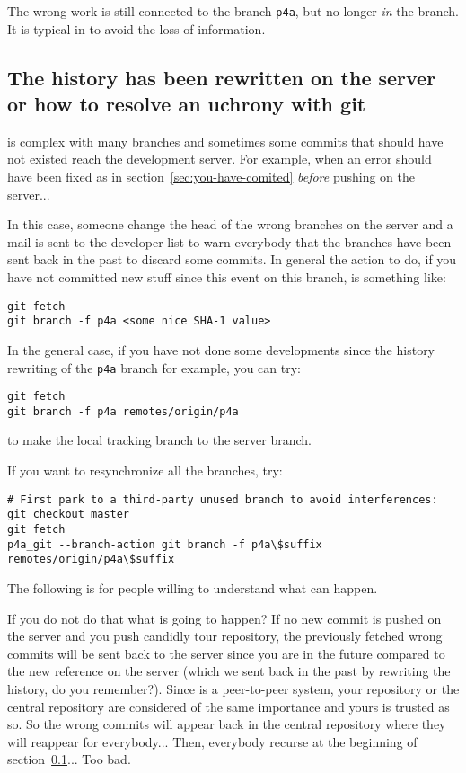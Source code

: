 \documentclass[a4paper]{article}
\begin{document}
The wrong work is still connected to the branch
\texttt{p4a}, but no longer \emph{in} the branch. It is typical in
\Agit to avoid the loss
of information.


\subsection{The history has been rewritten on the server or how to resolve
  an uchrony with git}
\label{sec:history-has-been}

\Apfa is complex with many branches and sometimes some commits that should
have not existed reach the development server. For example, when an error
should have been fixed as in section~\ref{sec:you-have-comited}
\emph{before} pushing on the server...

In this case, someone change the head of the wrong branches on the server
and a mail is sent to the developer list to warn everybody that the
branches have been sent back in the past to discard some commits. In
general the action to do, if you have not committed new stuff since this
event on this branch, is something like:
\begin{verbatim}
git fetch
git branch -f p4a <some nice SHA-1 value>
\end{verbatim}

In the general case, if you have not done some developments since the
history rewriting of the \texttt{p4a} branch for example, you can try:
\begin{verbatim}
git fetch
git branch -f p4a remotes/origin/p4a
\end{verbatim}
to make the local tracking branch to the server branch.

If you want to resynchronize all the branches, try:
\begin{verbatim}
# First park to a third-party unused branch to avoid interferences:
git checkout master
git fetch
p4a_git --branch-action git branch -f p4a\$suffix remotes/origin/p4a\$suffix
\end{verbatim}

The following is for people willing to understand what can happen.

If you do not do that what is going to happen? If no new commit is pushed
on the server and you push candidly tour repository, the previously
fetched wrong commits will be sent back to the server since you are in the
future compared to the new reference on the server (which we sent back in
the past by rewriting the history, do you remember?). Since \Agit is a
peer-to-peer system, your repository or the central repository are
considered of the same importance and yours is trusted as so. So the wrong
commits will appear back in the central repository where they will
reappear for everybody... \frownie{} Then, everybody recurse at the
beginning of section~\ref{sec:history-has-been}... Too bad.
\end{document}
